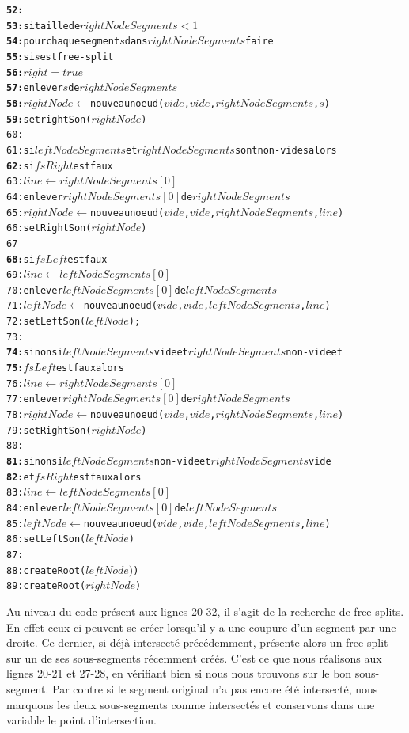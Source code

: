 \documentclass[11pt,a4paper]{article}
\begin{document}
\begin{alltt}
\textbf{52:}            
\textbf{53:}    si taille de \(rightNodeSegments < 1\)
\textbf{54:}      pour chaque segment \(s\) dans \(rightNodeSegments\) faire
\textbf{55:}        si \(s\) est free-split
\textbf{56:}          \(right = true\)
\textbf{57:}          enlever \(s\) de \(rightNodeSegments\)
\textbf{58:}          \(rightNode \leftarrow \) nouveau noeud (\(vide\), \(vide\), \(rightNodeSegments\), \(s\))
\textbf{59:}          setrightSon(\(rightNode\))
60:
61:   si \(leftNodeSegments\) et \(rightNodeSegments\) sont non-vides alors
\textbf{62:}	    si \(fsRight\) est faux
63:       \(line \leftarrow rightNodeSegments[0]\)
64:       enlever \(rightNodeSegments[0]\) de \(rightNodeSegments\)
65:       \(rightNode \leftarrow\) nouveau noeud (\(vide\), \(vide\), \(rightNodeSegments\), \(line\))
66:       setRightSon(\(rightNode\))
67
\textbf{68:}	    si \(fsLeft\) est faux
69:       \(line \leftarrow leftNodeSegments[0]\)
70:       enlever \(leftNodeSegments[0]\) de \(leftNodeSegments\)
71:       \(leftNode \leftarrow\) nouveau noeud (\(vide\), \(vide\), \(leftNodeSegments\), \(line\))
72:       setLeftSon(\(leftNode\));
73:     
\textbf{74:}   sinon si \(leftNodeSegments\) vide et \(rightNodeSegments\) non-vide et
\textbf{75:}   \(fsLeft\) est faux alors
76:     \(line \leftarrow rightNodeSegments[0]\)
77:     enlever \(rightNodeSegments[0]\) de \(rightNodeSegments\)
78:     \(rightNode \leftarrow \) nouveau noeud (\(vide\), \(vide\), \(rightNodeSegments\), \(line\))
79:     setRightSon(\(rightNode\))
80:    
\textbf{81:}   sinon si \(leftNodeSegments\) non-vide et \(rightNodeSegments\) vide 
\textbf{82:}   et \(fsRight\) est faux alors
83:     \(line \leftarrow leftNodeSegments[0]\)
84:     enlever \(leftNodeSegments[0]\) de \(leftNodeSegments\)
85:     \(leftNode \leftarrow \) nouveau noeud (\(vide\), \(vide\), \(leftNodeSegments\), \(line\))
86:     setLeftSon(\(leftNode\))
87:     
88:   createRoot(\(leftNode)\))
89:   createRoot(\(rightNode\))
\end{alltt}

Au niveau du code présent aux lignes 20-32, il s'agit de la recherche de free-splits. En effet ceux-ci peuvent se créer lorsqu'il y a une coupure d'un segment par une droite. Ce dernier, si déjà intersecté précédemment, présente alors un free-split sur un de ses sous-segments récemment créés. C'est ce que nous réalisons aux lignes 20-21 et 27-28, en vérifiant bien si nous nous trouvons sur le bon sous-segment. Par contre si le segment original n'a pas encore été intersecté, nous marquons les deux sous-segments comme intersectés et conservons dans une variable le point d'intersection. \\
\end{document}
